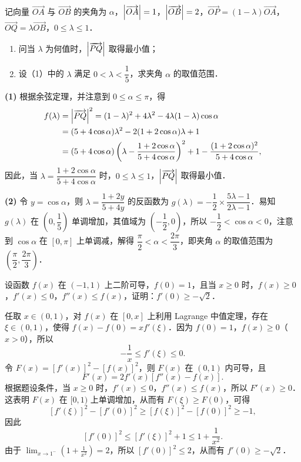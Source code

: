记向量 $\overrightarrow{OA}$ 与 $\overrightarrow{OB}$ 的夹角为 $\alpha$，$\left|\overrightarrow{OA}\right|=1$，$\left|\overrightarrow{OB}\right|=2$，$\overrightarrow{OP}=(1-\lambda)\overrightarrow{OA}$，$\overrightarrow{OQ}=\lambda\overrightarrow{OB}$，$0\le\lambda\le1$．
\begin{enumerate}[label=(\arabic*)]
  \item 问当 $\lambda$ 为何值时，$\left|\overrightarrow{PQ}\right|$ 取得最小值；
  \item 设（1）中的 $\lambda$ 满足 $0<\lambda<\dfrac15$，求夹角 $\alpha$ 的取值范围．
\end{enumerate}
\begin{solution}
\textbf{(1)} 根据余弦定理，并注意到 $0\le\alpha\le\pi$，得
\begin{align*}
f(\lambda)&=\left|\overrightarrow{PQ}\right|^2=(1-\lambda)^2+4\lambda^2-4\lambda(1-\lambda)\cos\alpha\\
&=(5+4\cos\alpha)\lambda^2-2(1+2\cos\alpha)\lambda+1\\
&=(5+4\cos\alpha)\left(\lambda-\frac{1+2\cos\alpha}{5+4\cos\alpha}\right)^2
+1-\frac{(1+2\cos\alpha)^2}{5+4\cos\alpha},
\end{align*}
因此，当 $\lambda=\dfrac{1+2\cos\alpha}{5+4\cos\alpha}$ 时，$0\le\lambda\le1$，$\left|\overrightarrow{PQ}\right|$ 取得最小值．

\textbf{(2)} 令 $y=\cos\alpha$，则 $\lambda=\dfrac{1+2y}{5+4y}$ 的反函数为 $g(\lambda)=-\dfrac12\times\dfrac{5\lambda-1}{2\lambda-1}$．易知 $g(\lambda)$ 在 $\left(0,\dfrac15\right)$ 单调增加，其值域为 $\left(-\dfrac12,0\right)$，所以 $-\dfrac12<\cos\alpha<0$，注意到 $\cos\alpha$ 在 $[0,\pi]$ 上单调减，解得 $\dfrac{\pi}{2}<\alpha<\dfrac{2\pi}{3}$，即夹角 $\alpha$ 的取值范围为 $\left(\dfrac{\pi}{2},\dfrac{2\pi}{3}\right)$．
\end{solution}

设函数 $f(x)$ 在 $(-1,1)$ 上二阶可导，$f(0)=1$，且当 $x\ge0$ 时，$f(x)\ge0$，$f'(x)\le0$，$f''(x)\le f(x)$，证明：$f'(0)\ge-\sqrt2$．
\begin{solution}
任取 $x\in(0,1)$，对 $f(x)$ 在 $[0,x]$ 上利用 Lagrange 中值定理，存在 $\xi\in(0,1)$，使得 $f(x)-f(0)=xf'(\xi)$．因为 $f(0)=1$，$f(x)\ge0$（$x>0$），所以
\[
-\frac1x\le f'(\xi)\le0.
\]
令 $F(x)=[f'(x)]^2-[f(x)]^2$，则 $F(x)$ 在 $(0,1)$ 内可导，且
\[
F'(x)=2f'(x)[f''(x)-f(x)].
\]
根据题设条件，当 $x\ge0$ 时，$f'(x)\le0$，$f''(x)\le f(x)$，所以 $F'(x)\ge0$．这表明 $F(x)$ 在 $[0,1)$ 上单调增加，从而有 $F(\xi)\ge F(0)$，可得
\[
[f'(\xi)]^2-[f'(0)]^2\ge[f(\xi)]^2-[f(0)]^2\ge-1,
\]
因此
\[
[f'(0)]^2\le[f'(\xi)]^2+1\le1+\frac{1}{x^2}.
\]
由于 $\displaystyle \lim_{x\to1^-}\left(1+\frac{1}{x^2}\right)=2$，所以 $[f'(0)]^2\le2$，从而有 $f'(0)\ge-\sqrt2$．
\end{solution}

